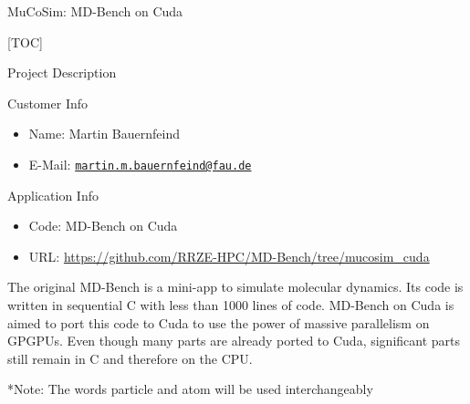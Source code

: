 \documentclass[ignorenonframetext,]{beamer}
\date{}
\providecommand{\tightlist}{%
  \setlength{\itemsep}{0pt}\setlength{\parskip}{0pt}}
\begin{document}
\begin{frame}

\end{frame}

\begin{frame}{MuCoSim: MD-Bench on Cuda}
\protect\hypertarget{mucosim-md-bench-on-cuda}{}

{[}TOC{]}

\begin{block}{Project Description}

\begin{block}{Customer Info}

\begin{itemize}
\tightlist
\item
  Name: Martin Bauernfeind
\item
  E-Mail:
  \href{mailto:martin.m.bauernfeind@fau.de}{\nolinkurl{martin.m.bauernfeind@fau.de}}
\end{itemize}

\end{block}

\end{block}

\end{frame}

\begin{frame}

\begin{block}{Application Info}

\begin{itemize}
\tightlist
\item
  Code: MD-Bench on Cuda
\item
  URL:
  \href{https://github.com/RRZE-HPC/MD-Bench/tree/mucosim_cuda}{https://github.com/RRZE-HPC/MD-Bench/tree/mucosim\_cuda}
\end{itemize}

The original MD-Bench is a mini-app to simulate molecular dynamics. Its
code is written in sequential C with less than 1000 lines of code.
MD-Bench on Cuda is aimed to port this code to Cuda to use the power of
massive parallelism on GPGPUs. Even though many parts are already ported
to Cuda, significant parts still remain in C and therefore on the CPU.

*Note: The words particle and atom will be used interchangeably

\end{block}

\end{frame}
\end{document}
